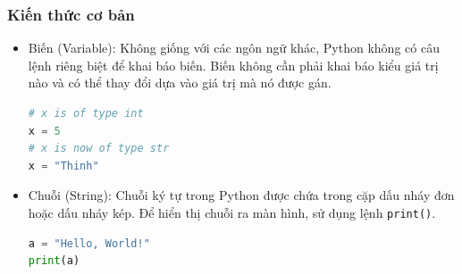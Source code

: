 \subsubsection{Kiến thức cơ bản}
\begin{itemize}
	\item Biến (Variable): Không giống với các ngôn ngữ khác, Python không có câu lệnh riêng biệt để khai báo biến. Biến không cần phải khai báo kiểu giá trị nào và có thể thay đổi dựa vào giá trị mà nó được gán.
	\begin{lstlisting}[language=Python]
# x is of type int
x = 5
# x is now of type str
x = "Thinh"
	\end{lstlisting}
	\item Chuỗi (String): Chuỗi ký tự trong Python được chứa trong cặp dấu nháy đơn hoặc dấu nháy kép. Để hiển thị chuỗi ra màn hình, sử dụng lệnh \texttt{print()}.
	\begin{lstlisting}[language=Python]
a = "Hello, World!"
print(a)


\end{lstlisting}
\end{itemize}
